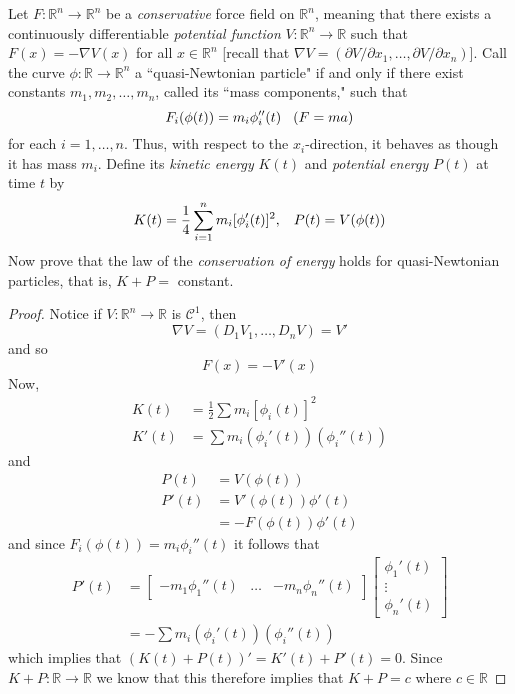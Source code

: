 \question Let \( F: \mathbb{R}^n \rightarrow \mathbb{R}^n \) be a \emph{conservative} force field on \( \mathbb{R}^n \), meaning that there exists a continuously differentiable \emph{potential function} \( V: \mathbb{R}^n \rightarrow \mathbb{R} \) such that \( F(x) = -\nabla V(x) \) for all \( x \in \mathbb{R}^n \) [recall that \(\nabla V = \left( \partial V / \partial x_1,\ldots, \partial V/ \partial x_n \right) \)]. Call the curve \( \phi: \mathbb{R} \rightarrow \mathbb{R}^n \) a ``quasi-Newtonian particle" if and only if there exist constants \( m_1, m_2,\ldots,m_n \), called its ``mass components," such that
\[
F_i(\phi(t)) = m_i\phi_i''(t) \hspace{3mm} (F=ma)
\]
for each \( i=1,\ldots,n \). Thus, with respect to the \( x_i \)-direction, it behaves as though it has mass \( m_i \). Define its \emph{kinetic energy} \( K(t) \) and \emph{potential energy} \( P(t) \) at time \( t \) by
\[
K(t) = \frac{1}{4}\sum_{i=1}^n m_i[\phi_i'(t)]^2, \hspace{3mm} P(t) = V(\phi(t))
\]
Now prove that the law of the \emph{conservation of energy} holds for quasi-Newtonian particles, that is, \( K+P =\) constant.

\begin{proof}
Notice if \( V: \mathbb{R}^n \rightarrow \mathbb{R} \) is \( \mathscr{C}^1 \), then
\[
\nabla V = (D_1V_1,\ldots,D_nV) = V'
\]
and so
\[
F(x) = -V'(x)
\]
Now,
\begin{align*}
K(t) &= \frac{1}{2}\sum m_i[\phi_i(t)]^2 \\
K'(t) &= \sum m_i(\phi_i'(t))(\phi_i''(t))
\end{align*}
and
\begin{align*}
P(t) &= V(\phi(t)) \\
P'(t) &= V'(\phi(t))\phi'(t) \\
&= -F(\phi(t))\phi'(t)
\end{align*}
and since \( F_i(\phi(t))=m_i\phi_i''(t) \) it follows that
\begin{align*}
P'(t) &= \left[ \begin{array}{ccc} -m_1\phi_1''(t) & \ldots & -m_n\phi_n''(t) \end{array}  \right] \left[ \begin{array}{c} \phi_1'(t) \\ \vdots \\ \phi_n'(t) \end{array} \right] \\
&= -\sum m_i(\phi_i'(t))(\phi_i''(t))
\end{align*}
which implies that \( (K(t)+P(t))' = K'(t) + P'(t) = 0 \). Since \( K+P: \mathbb{R} \rightarrow \mathbb{R} \) we know that this therefore implies that \( K+P = c \) where \( c \in \mathbb{R} \)
\end{proof}

